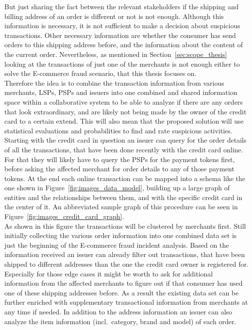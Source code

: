 But just sharing the fact between the relevant stakeholders if the shipping and billing address of an order is different or not is not enough. Although this information is necessary, it is not sufficient to make a decision about suspicious transactions. Other necessary information are whether the consumer has send orders to this shipping address before, and the information about the content of the current order. Nevertheless, as mentioned in Section~\ref{sec:scope_thesis} looking at the transactions of just one of the merchants is not enough either to solve the \gls{E-commerce} fraud scenario, that this thesis focuses on. \\

Therefore the idea is to combine the transaction information from various merchants, \gls{LSP}s, \gls{PSP}s and issuers into one combined and shared information space within a collaborative system to be able to analyze if there are any orders that look extraordinary, and are likely not being made by the owner of the credit card to a certain extend. This will also mean that the proposed solution will use statistical evaluations and probabilities to find and rate suspicious activities. Starting with the credit card in question an issuer can query for the order details of all the transactions, that have been done recently with the credit card online. For that they will likely have to query the \gls{PSP}s for the payment tokens first, before asking the affected merchant for order details to any of those payment tokens. At the end each online transaction can be mapped into a schema like the one shown in Figure~\ref{fig:images_data_model}, building up a large graph of entities and  the relationships between them, and with the specific credit card in the center of it. An abbreviated sample graph of this procedure can be seen in Figure~\ref{fig:images_credit_card_graph}. \\

As shown in this figure the transactions will be clustered by merchants first. Still initially collecting the various order information into one combined data set is just the beginning of the \gls{E-commerce} fraud incident analysis. Based on the information received an issuer can already filter out transactions, that have been shipped to different addresses than the one the credit card owner is registered for. Especially for those edge cases it might be worth to ask for additional information from the affected merchants to figure out if that consumer has used one of these shipping addresses before. As a result the existing data set can be further enriched with supplementary transactional information from merchants at any time if needed. In addition to the address information an issuer can also analyze the item information (incl.\ category, brand and model) of each order. \\

